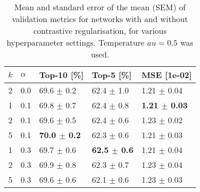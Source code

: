 \begin{table}[h]
\caption{Mean and standard error of the mean (SEM) of validation metrics for networks with and without contrastive regularisation, for various hyperparameter settings. Temperature $	au = 0.5$ was used.}
\label{tab:cr_32}
\begin{tabular}{rllll}
\toprule
$k$ & $\alpha$ & Top-10 [\%] & Top-5 [\%] & MSE [1e-02] \\
\midrule
2 & 0.0 & 69.6 $\pm$ 0.2 & 62.4 $\pm$ 1.0 & 1.21 $\pm$ 0.04 \\
1 & 0.1 & 69.8 $\pm$ 0.7 & 62.4 $\pm$ 0.8 & \textbf{1.21 $\pm$ 0.03} \\
2 & 0.1 & 69.6 $\pm$ 0.5 & 62.4 $\pm$ 0.6 & 1.23 $\pm$ 0.02 \\
5 & 0.1 & \textbf{70.0 $\pm$ 0.2} & 62.3 $\pm$ 0.6 & 1.21 $\pm$ 0.03 \\
1 & 0.3 & 69.7 $\pm$ 0.6 & \textbf{62.5 $\pm$ 0.6} & 1.21 $\pm$ 0.04 \\
2 & 0.3 & 69.9 $\pm$ 0.8 & 62.3 $\pm$ 0.7 & 1.23 $\pm$ 0.04 \\
5 & 0.3 & 69.6 $\pm$ 0.6 & 62.1 $\pm$ 0.6 & 1.23 $\pm$ 0.03 \\
\bottomrule
\end{tabular}
\end{table}
